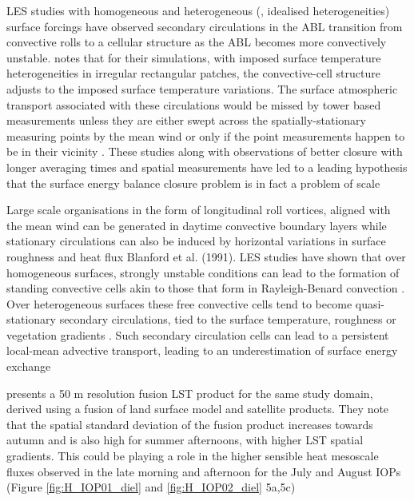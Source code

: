 \documentclass[draft]{agujournal2019}
\begin{document}
LES studies with homogeneous \cite{salesky_nature_2017, li_coherent_2011} and heterogeneous (, idealised heterogeneities) surface forcings have observed secondary circulations in the ABL transition from convective rolls to a cellular structure as the ABL becomes more convectively unstable.  notes that for their simulations, with imposed surface temperature heterogeneities in irregular rectangular patches, the convective-cell structure adjusts to the imposed surface temperature variations. The surface atmospheric transport associated with these circulations would be missed by tower based measurements unless they are either swept across the spatially-stationary measuring points by the mean wind or only if the point measurements happen to be in their vicinity \cite{mahrt_computing_2010, charuchittipan_extension_2014}.  These studies along with observations of better closure with longer averaging times and spatial measurements have led to a leading hypothesis that the surface energy balance closure problem is in fact a problem of scale \cite{foken_energy_2008, foken_energy_2010, mauder_surface-energy-balance_2020}

Large scale organisations in the form of longitudinal roll vortices, aligned with the mean wind can be generated in daytime convective boundary layers \cite{etling_roll_1993} while stationary circulations can also be induced by horizontal variations in surface roughness and heat flux \cite{desjardins_scaling_1997, sun_transport_1998} Blanford et al. (1991). LES studies have shown that over homogeneous surfaces, strongly unstable conditions can lead to the formation of standing convective cells akin to those that form in Rayleigh-Benard convection  \cite{kanda_les_2004, de_roo_influence_2018}. Over heterogeneous surfaces these free convective cells tend to become quasi-stationary secondary circulations, tied to the surface temperature, roughness or vegetation gradients \cite{inagaki_impact_2006, maronga_large-eddy_2013}. Such secondary circulation cells can lead to a persistent local-mean advective transport, leading to an underestimation of surface energy exchange \cite{morrison_impact_2021}

\cite{desai_multisensor_2021} presents a 50 m resolution fusion LST product for the same study domain, derived using a fusion of land surface model and satellite products. They note that the spatial standard deviation of the fusion product increases towards autumn and is also high for summer afternoons, with higher LST spatial gradients. This could be playing a role in the higher sensible heat mesoscale fluxes observed in the late morning and afternoon for the July and August IOPs (Figure \ref{fig:H_IOP01_diel} and \ref{fig:H_IOP02_diel} 5a,5c)
\end{document}
